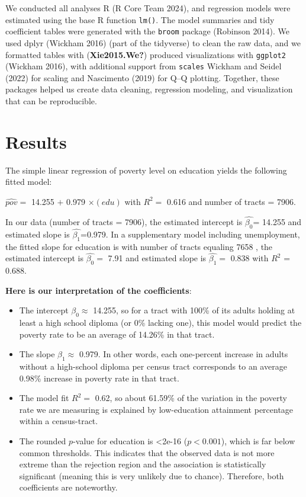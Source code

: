 \documentclass[
  letterpaper,
  DIV=11,
  numbers=noendperiod]{scrartcl}
\begin{document}
We conducted all analyses R (R Core Team 2024), and regression models
were estimated using the base R function \texttt{lm()}. The model
summaries and tidy coefficient tables were generated with the
\texttt{broom} package (Robinson 2014). We used dplyr (Wickham 2016)
(part of the tidyverse) to clean the raw data, and we formatted tables
with (\textbf{Xie2015.We?}) produced visualizations with
\texttt{ggplot2} (Wickham 2016), with additional support from
\texttt{scales} Wickham and Seidel (2022) for scaling and Nascimento
(2019) for Q--Q plotting. Together, these packages helped us create data
cleaning, regression modeling, and visualization that can be
reproducible.

\section{Results}\label{sec-results}

The simple linear regression of poverty level on education yields the
following fitted model:

\(\widehat{pov}=\) 14.255 \(+\) 0.979 \(\times(edu)\) with \(R^2=\)
0.616 and number of tracts = 7906.

In our data (number of tracts = 7906), the estimated intercept is
\(\hat{\beta_0}\)= 14.255 and estimated slope is
\(\hat{\beta_1}\)=0.979. In a supplementary model including
unemployment, the fitted slope for education is with number of tracts
equaling 7658 , the estimated intercept is \(\hat{\beta_0}=\) 7.91 and
estimated slope is \(\hat{\beta_1}=\) 0.838 with \(R^2\) = 0.688.

\textbf{Here is our interpretation of the coefficients}:

\begin{itemize}
\item
  The intercept \(\beta_0 \approx\) 14.255, so for a tract with 100\% of
  its adults holding at least a high school diploma (or 0\% lacking
  one), this model would predict the poverty rate to be an average of
  14.26\% in that tract.
\item
  The slope \(\beta_1 \approx\) 0.979. In other words, each one-percent
  increase in adults without a high-school diploma per census tract
  corresponds to an average 0.98\% increase in poverty rate in that
  tract.
\item
  The model fit \(R^2=\) 0.62, so about 61.59\% of the variation in the
  poverty rate we are measuring is explained by low-education attainment
  percentage within a census-tract.
\item
  The rounded \(p\)-value for education is \textless2e-16
  (\(p < 0.001\)), which is far below common thresholds. This indicates
  that the observed data is not more extreme than the rejection region
  and the association is statistically significant (meaning this is very
  unlikely due to chance). Therefore, both coefficients are noteworthy.
\end{itemize}
\end{document}
